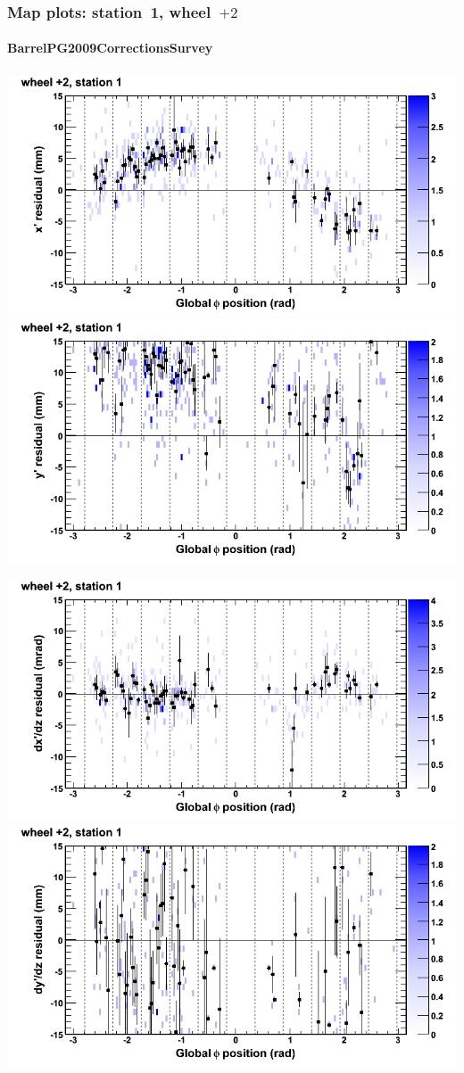\documentclass[compress]{beamer}
\begin{document}
\begin{frame}
\frametitle{Map plots: station~1, wheel~$+2$}
\framesubtitle{BarrelPG2009CorrectionsSurvey}
\includegraphics[width=0.5\linewidth]{mapplots_01/DTvsphi_st1whE_x.png}
\includegraphics[width=0.5\linewidth]{mapplots_01/DTvsphi_st1whE_y.png}

\includegraphics[width=0.5\linewidth]{mapplots_01/DTvsphi_st1whE_dxdz.png}
\includegraphics[width=0.5\linewidth]{mapplots_01/DTvsphi_st1whE_dydz.png}
\end{frame}
\end{document}
